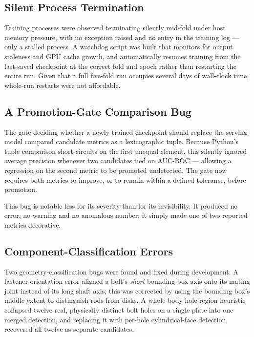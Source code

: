 \documentclass[12pt,oneside,a4paper]{report}
\begin{document}
\subsection{Silent Process Termination}

Training processes were observed terminating silently mid-fold under host
memory pressure, with no exception raised and no entry in the training log
--- only a stalled process. A watchdog script was built that monitors for
output staleness and GPU cache growth, and automatically resumes training
from the last-saved checkpoint at the correct fold and epoch rather than
restarting the entire run. Given that a full five-fold run occupies several
days of wall-clock time, whole-run restarts were not affordable.

\subsection{A Promotion-Gate Comparison Bug}

The gate deciding whether a newly trained checkpoint should replace the
serving model compared candidate metrics as a lexicographic tuple. Because
Python's tuple comparison short-circuits on the first unequal element, this
silently ignored average precision whenever two candidates tied on AUC-ROC
--- allowing a regression on the second metric to be promoted undetected. The
gate now requires both metrics to improve, or to remain within a defined
tolerance, before promotion.

This bug is notable less for its severity than for its invisibility. It
produced no error, no warning and no anomalous number; it simply made one of
two reported metrics decorative.

\subsection{Component-Classification Errors}

Two geometry-classification bugs were found and fixed during development. A
fastener-orientation error aligned a bolt's \emph{short} bounding-box axis
onto its mating joint instead of its long shaft axis; this was corrected by
using the bounding box's middle extent to distinguish rods from disks. A
whole-body hole-region heuristic collapsed twelve real, physically distinct
bolt holes on a single plate into one merged detection, and replacing it with
per-hole cylindrical-face detection recovered all twelve as separate
candidates.
\end{document}

